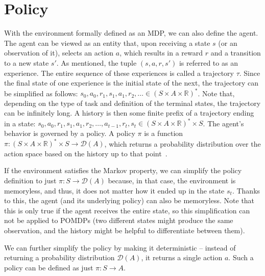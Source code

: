 \documentclass[
  digital,     %
  oneside,     %
  nosansbold,  %
  nocolorbold, %
  lof,         %
  lot,         %
]{fithesis4}
\begin{document}
\section{Policy}
With the environment formally defined as an MDP, we can also define the agent. The agent can be viewed as an entity that, upon receiving a state $s$ (or an observation of it), selects an action $a$, which results in a reward $r$ and a transition to a new state $s'$. As mentioned, the tuple $(s, a, r, s')$ is referred to as an experience. The entire sequence of these experiences is called a trajectory $\tau$. Since the final state of one experience is the initial state of the next, the trajectory can be simplified as follows: $s_0,a_0,r_1,s_1,a_1,r_2,\dotsc \in (S\times A \times \mathbb{R})^{*}$. Note that, depending on the type of task and definition of the terminal states, the trajectory can be infinitely long. A history is then some finite prefix of a trajectory ending in a state: $s_0,a_0,r_1,s_1,a_1,r_2,\dotsc, a_{t-1},r_t,s_t\in (S\times A \times \mathbb{R})^{*}\times S$.
The agent's behavior is governed by a policy. A policy $\pi$ is a function $\pi\colon (S\times A \times \mathbb{R})^{*}\times S \to \mathcal{D}(A)$, which returns a probability distribution over the action space based on the history up to that point~\cite{PA230}.

If the environment satisfies the Markov property, we can simplify the policy definition to just $\pi\colon S \to \mathcal{D}(A)$ because, in that case, the environment is memoryless, and thus, it does not matter how it ended up in the state $s_t$. Thanks to this, the agent (and its underlying policy) can also be memoryless. Note that this is only true if the agent receives the entire state, so this simplification can not be applied to POMDPs (two different states might produce the same observation, and the history might be helpful to differentiate between them).

We can further simplify the policy by making it deterministic -- instead of returning a probability distribution $\mathcal{D}(A)$, it returns a single action $a$. Such a policy can be defined as just $\pi\colon S\to A$.
\end{document}
